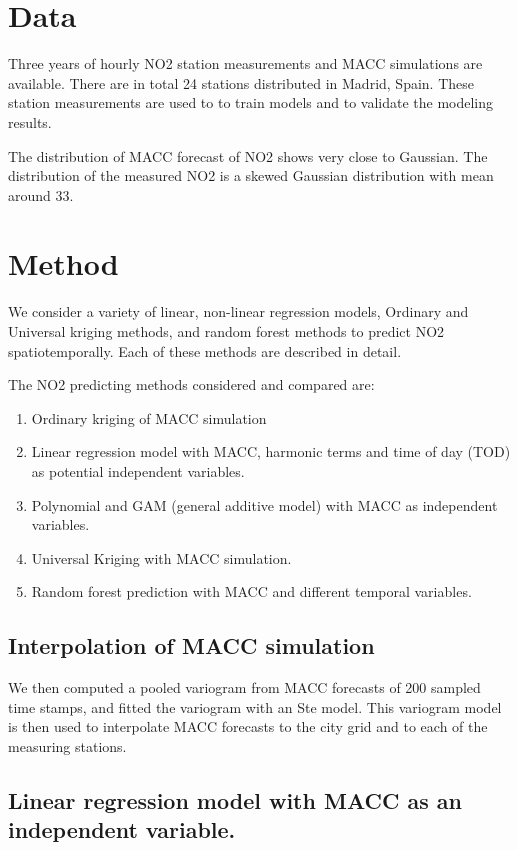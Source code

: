 \documentclass{article}
\begin{document}
 
 
\section{Data}

Three years of hourly NO2 station measurements and MACC simulations are available. There are in total 24 stations distributed in Madrid, Spain. These station measurements are used to to train models and to validate the modeling results.

The distribution of MACC forecast of NO2 shows very close to Gaussian. The distribution of the measured NO2 is a skewed Gaussian distribution with mean around 33.


\section{Method}
We consider a variety of linear, non-linear regression models, Ordinary and Universal kriging methods, and random forest methods to predict NO2 spatiotemporally. Each of these methods are described in detail.  

The NO2 predicting methods considered and compared are:
\begin{enumerate}
    \item Ordinary kriging of MACC simulation
    \item Linear regression model with MACC, harmonic terms and time of day (TOD) as potential independent variables.
    \item Polynomial and GAM (general additive model) with MACC as independent variables. 
    \item Universal Kriging with MACC simulation.
    \item Random forest prediction with MACC and different temporal variables. 
     
\end{enumerate}


\subsection{Interpolation of MACC simulation} 

We then computed a pooled variogram from MACC forecasts of 200 sampled time stamps, and fitted the variogram with an Ste model. This variogram model is then used to interpolate MACC forecasts to the city grid and to each of the measuring stations. 

\subsection{Linear regression model with MACC as an independent variable.}
\end{document}
